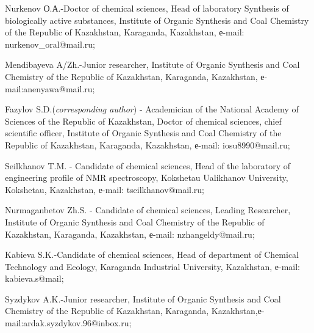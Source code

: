 \begin{noparindent}
Nurkenov О.А.-Doctor of chemical sciences, Head of laboratory Synthesis
of biologically active substances, Institute of Organic Synthesis and
Coal Chemistry of the Republic of Kazakhstan, Karaganda, Kazakhstan,
е-mail: nurkenov\_oral@mail.ru;

Mendibayeva A/Zh.-Junior researcher, Institute of Organic Synthesis and
Coal Chemistry of the Republic of Kazakhstan, Karaganda, Kazakhstan,
е-mail:anenyawa@mail.ru;

Fazylov S.D.(\emph{corresponding author}) - Academician of the National
Academy of Sciences of the Republic of Kazakhstan, Doctor of chemical
sciences, chief scientific officer, Institute of Organic Synthesis and
Coal Chemistry of the Republic of Kazakhstan, Karaganda, Kazakhstan,
е-mail: iosu8990@mail.ru;

Seilkhanov T.M. - Candidate of chemical sciences, Head of the laboratory
of engineering profile of NMR spectroscopy, Kokshetau Ualikhanov
University, Kokshetau, Kazakhstan, е-mail: tseilkhanov@mail.ru;

Nurmaganbetov Zh.S. - Candidate of chemical sciences, Leading
Researcher, Institute of Organic Synthesis and Coal Chemistry of the
Republic of Kazakhstan, Karaganda, Kazakhstan, е-mail:
nzhangeldy@mail.ru;

Kabieva S.K.-Candidate of chemical sciences, Head of department of
Chemical Technology and Ecology, Karaganda Industrial University,
Kazakhstan, е-mail: kabieva.s@mail;

Syzdykov A.K.-Junior researcher, Institute of Organic Synthesis and Coal
Chemistry of the Republic of Kazakhstan, Karaganda,
Kazakhstan,е-mail:ardak.syzdykov.96@inbox.ru;
\end{noparindent}
